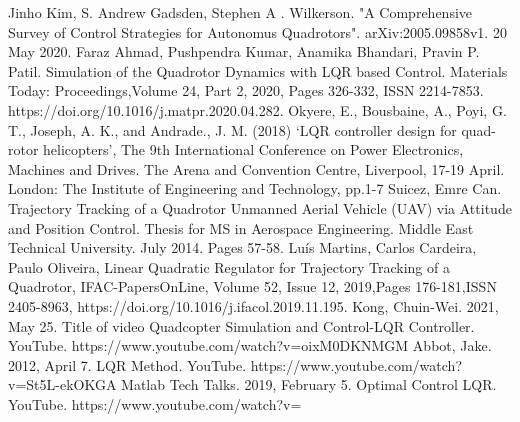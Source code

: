 \documentclass{article}
\begin{document}
\begin{multicols}{2}
\label{References}

\begin{thebibliography}{10}
Jinho Kim, S. Andrew Gadsden, Stephen A . Wilkerson.
"A Comprehensive Survey of Control Strategies for Autonomus Quadrotors".
arXiv:2005.09858v1.
20 May 2020.
Faraz Ahmad, Pushpendra Kumar, Anamika Bhandari, Pravin P. Patil.
Simulation of the Quadrotor Dynamics with LQR based Control.
Materials Today: Proceedings,Volume 24, Part 2, 2020, Pages 326-332,
ISSN 2214-7853.
https://doi.org/10.1016/j.matpr.2020.04.282.
Okyere, E., Bousbaine, A., Poyi, G. T., Joseph, A. K., and Andrade.,
J. M. (2018) ‘LQR controller design for quad-rotor helicopters’,
The 9th International Conference on Power Electronics, Machines
and Drives. The Arena and Convention Centre, Liverpool, 17-19
April. London: The Institute of Engineering and Technology, pp.1-7
Suicez, Emre Can.  Trajectory Tracking of a Quadrotor Unmanned Aerial Vehicle (UAV) via Attitude and Position Control.  Thesis for MS in Aerospace Engineering.  Middle East Technical University. July 2014. Pages 57-58.
Luís Martins, Carlos Cardeira, Paulo Oliveira,
Linear Quadratic Regulator for Trajectory Tracking of a Quadrotor,
IFAC-PapersOnLine,
Volume 52, Issue 12, 2019,Pages 176-181,ISSN 2405-8963,
https://doi.org/10.1016/j.ifacol.2019.11.195.
Kong, Chuin-Wei.  2021, May 25. Title of video Quadcopter Simulation and Control-LQR Controller. YouTube. https://www.youtube.com/watch?v=oixM0DKNMGM
Abbot, Jake. 2012, April 7. LQR Method. YouTube. https://www.youtube.com/watch?v=St5L-ekOKGA
Matlab Tech Talks. 2019, February 5. Optimal Control LQR. YouTube. https://www.youtube.com/watch?v=


\end{thebibliography}

\end{multicols}
\end{document}

